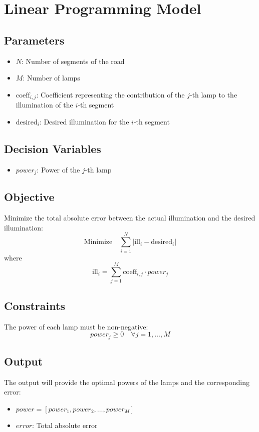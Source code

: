 \documentclass{article}
\begin{document}
\section*{Linear Programming Model}

\subsection*{Parameters}
\begin{itemize}
    \item $N$: Number of segments of the road
    \item $M$: Number of lamps
    \item $\text{coeff}_{i,j}$: Coefficient representing the contribution of the $j$-th lamp to the illumination of the $i$-th segment
    \item $\text{desired}_i$: Desired illumination for the $i$-th segment
\end{itemize}

\subsection*{Decision Variables}
\begin{itemize}
    \item $power_j$: Power of the $j$-th lamp
\end{itemize}

\subsection*{Objective}
Minimize the total absolute error between the actual illumination and the desired illumination:
\[
\text{Minimize} \quad \sum_{i=1}^{N} | \text{ill}_i - \text{desired}_i |
\]
where
\[
\text{ill}_i = \sum_{j=1}^{M} \text{coeff}_{i,j} \cdot power_j
\]

\subsection*{Constraints}
The power of each lamp must be non-negative:
\[
power_j \geq 0 \quad \forall j = 1, \ldots, M
\]

\subsection*{Output}
The output will provide the optimal powers of the lamps and the corresponding error:
\begin{itemize}
    \item $power = [power_1, power_2, \ldots, power_M]$
    \item $error$: Total absolute error
\end{itemize}
\end{document}
